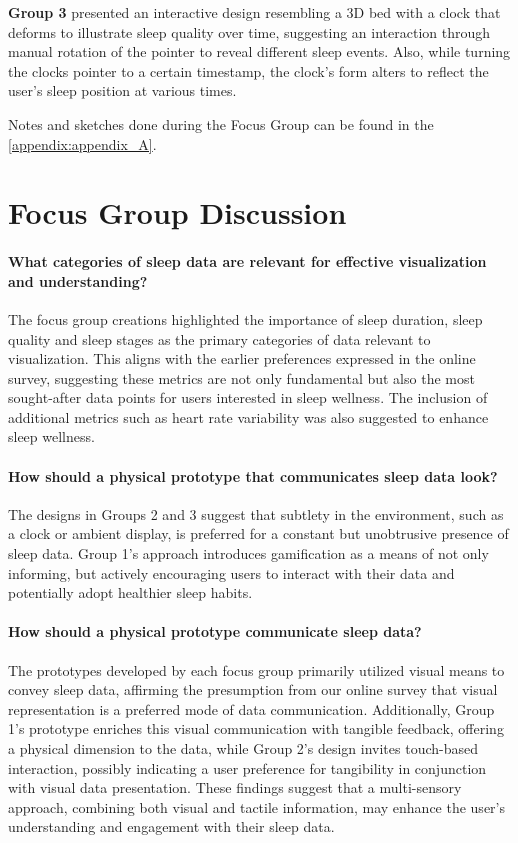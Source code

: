 \documentclass[
  a4paper,  %
  twoside,  %
  bibliography=totoc,
  headsepline,
  cleardoublepage=empty,
  parskip=half,
  draft=false
]{scrbook}
\begin{document}
\textbf{Group 3} presented an interactive design resembling a 3D bed with a clock that deforms to illustrate sleep quality over time, suggesting an interaction through manual rotation of the pointer to reveal different sleep events. Also, while turning the clocks pointer to a certain timestamp, the clock's form alters to reflect the user's sleep position at various times.

Notes and sketches done during the Focus Group can be found in the \autoref{appendix:appendix_A}.

\section{Focus Group Discussion}

\paragraph{What categories of sleep data are relevant for effective visualization and understanding?}
The focus group creations highlighted the importance of sleep duration, sleep quality and sleep stages as the primary categories of data relevant to visualization. This aligns with the earlier preferences expressed in the online survey, suggesting these metrics are not only fundamental but also the most sought-after data points for users interested in sleep wellness. The inclusion of additional metrics such as heart rate variability was also suggested to enhance sleep wellness. 

\paragraph{How should a physical prototype that communicates sleep data look?}
The designs in Groups 2 and 3 suggest that subtlety in the environment, such as a clock or ambient display, is preferred for a constant but unobtrusive presence of sleep data. Group 1's approach introduces gamification as a means of not only informing, but actively encouraging users to interact with their data and potentially adopt healthier sleep habits.

\paragraph{How should a physical prototype communicate sleep data?}
The prototypes developed by each focus group primarily utilized visual means to convey sleep data, affirming the presumption from our online survey that visual representation is a preferred mode of data communication. Additionally, Group 1's prototype enriches this visual communication with tangible feedback, offering a physical dimension to the data, while Group 2's design invites touch-based interaction, possibly indicating a user preference for tangibility in conjunction with visual data presentation. These findings suggest that a multi-sensory approach, combining both visual and tactile information, may enhance the user's understanding and engagement with their sleep data.
\end{document}

